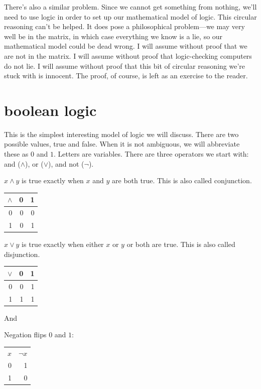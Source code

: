 \documentclass{scrbook}
\begin{document}
There's also a similar problem. Since we cannot get something from nothing, we'll need to use logic in order to set up our mathematical model of logic. This circular reasoning can't be helped. It does pose a philosophical problem---we may very well be in the matrix, in which case everything we know is a lie, so our mathematical model could be dead wrong. I will assume without proof that we are not in the matrix. I will assume without proof that logic-checking computers do not lie. I will assume without proof that this bit of circular reasoning we're stuck with is innocent. The proof, of course, is left as an exercise to the reader. 
\chapter[Boolean Logic]{boolean logic}
This is the simplest interesting model of logic we will discuss. There are two possible values, true and false. When it is not ambiguous, we will abbreviate these as $0$ and $1$. Letters are variables. There are three operators we start with: and ($\wedge$), or ($\vee$), and not ($\neg$). 
\begin{defn}
  \label{def:bool:and}
  $x \wedge y$ is true exactly when $x$ and $y$ are both true. This is also called conjunction.
  \begin{center}
    \begin{tabular}{r|rr}
      $\wedge$ & 0 & 1 \\
      \hline
      0 & 0 & 0 \\
      1 & 0 & 1 
    \end{tabular}
  \end{center}
\end{defn}

\begin{defn}[or $\vee$]
  \label{def:bool:or}
  $x \vee y$ is true exactly when either $x$ or $y$ or both are true. This is also called disjunction.
  \begin{center}
\begin{tabular}{r|rr}
$\vee$ & 0 & 1 \\
  \hline
0 & 0 & 1 \\
1 & 1 & 1 
\end{tabular}
\end{center}
\end{defn}
And
\begin{defn}
Negation flips $0$ and $1$:
  \begin{center}
\begin{tabular}{rr}
$x$ & $\neg x$ \\
0 & 1 \\
1 & 0 
\end{tabular}
\end{center}
\end{defn}
\end{document}
